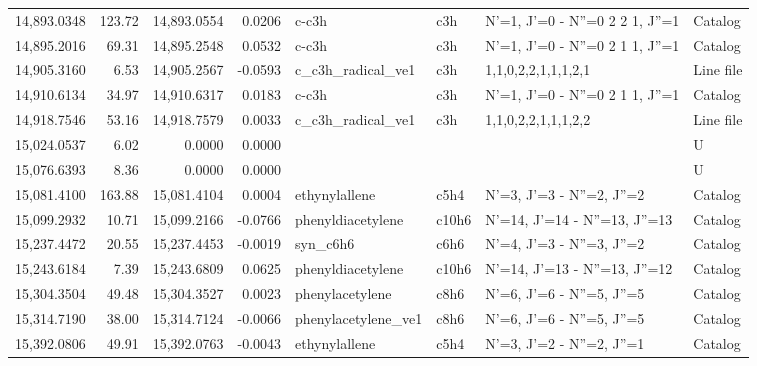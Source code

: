 \begin{longtable}{rrrrllll}
14,893.0348 &    123.72 &       14,893.0554 &    0.0206 &                       c-c3h &     c3h &      N'=1, J'=0 - N''=0 2 2 1, J''=1 &    Catalog \\
14,895.2016 &     69.31 &       14,895.2548 &    0.0532 &                       c-c3h &     c3h &      N'=1, J'=0 - N''=0 2 1 1, J''=1 &    Catalog \\
14,905.3160 &      6.53 &       14,905.2567 &   -0.0593 &           c_c3h_radical_ve1 &     c3h &                  1,1,0,2,2,1,1,1,2,1 &  Line file \\
14,910.6134 &     34.97 &       14,910.6317 &    0.0183 &                       c-c3h &     c3h &      N'=1, J'=0 - N''=0 2 1 1, J''=1 &    Catalog \\
14,918.7546 &     53.16 &       14,918.7579 &    0.0033 &           c_c3h_radical_ve1 &     c3h &                  1,1,0,2,2,1,1,1,2,2 &  Line file \\
15,024.0537 &      6.02 &            0.0000 &    0.0000 &                             &         &                                      &          U \\
15,076.6393 &      8.36 &            0.0000 &    0.0000 &                             &         &                                      &          U \\
15,081.4100 &    163.88 &       15,081.4104 &    0.0004 &               ethynylallene &    c5h4 &            N'=3, J'=3 - N''=2, J''=2 &    Catalog \\
15,099.2932 &     10.71 &       15,099.2166 &   -0.0766 &           phenyldiacetylene &   c10h6 &        N'=14, J'=14 - N''=13, J''=13 &    Catalog \\
15,237.4472 &     20.55 &       15,237.4453 &   -0.0019 &                    syn_c6h6 &    c6h6 &            N'=4, J'=3 - N''=3, J''=2 &    Catalog \\
15,243.6184 &      7.39 &       15,243.6809 &    0.0625 &           phenyldiacetylene &   c10h6 &        N'=14, J'=13 - N''=13, J''=12 &    Catalog \\
15,304.3504 &     49.48 &       15,304.3527 &    0.0023 &             phenylacetylene &    c8h6 &            N'=6, J'=6 - N''=5, J''=5 &    Catalog \\
15,314.7190 &     38.00 &       15,314.7124 &   -0.0066 &         phenylacetylene_ve1 &    c8h6 &            N'=6, J'=6 - N''=5, J''=5 &    Catalog \\
15,392.0806 &     49.91 &       15,392.0763 &   -0.0043 &               ethynylallene &    c5h4 &            N'=3, J'=2 - N''=2, J''=1 &    Catalog \\

\end{longtable}
